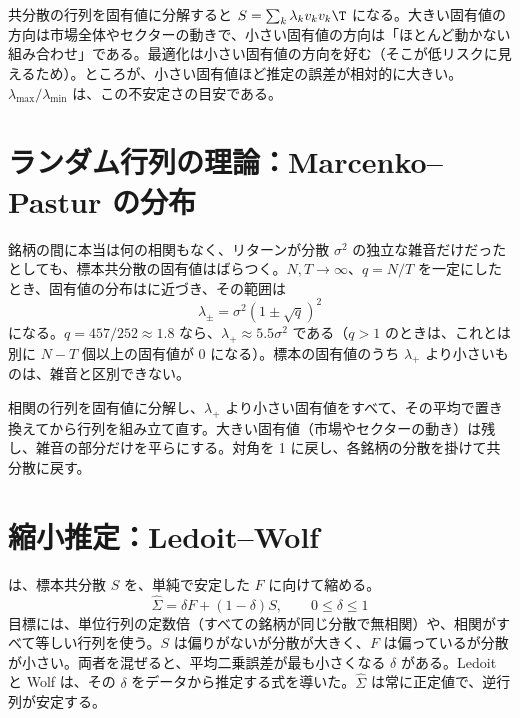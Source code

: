 共分散の行列を固有値に分解すると $S = \sum_k \lambda_k v_k v_k\T$ になる。大きい固有値の方向は市場全体やセクターの動きで、小さい固有値の方向は「ほとんど動かない組み合わせ」である。最適化は小さい固有値の方向を好む（そこが低リスクに見えるため）。ところが、小さい固有値ほど推定の誤差が相対的に大きい。 $\lambda_{\max}/\lambda_{\min}$ は、この不安定さの目安である。

\section{ランダム行列の理論：Marcenko--Pastur の分布}

銘柄の間に本当は何の相関もなく、リターンが分散 $\sigma^2$ の独立な雑音だけだったとしても、標本共分散の固有値はばらつく。$N,T\to\infty$、$q=N/T$ を一定にしたとき、固有値の分布はに近づき、その範囲は
\begin{equation}
\lambda_{\pm} = \sigma^2\left(1 \pm \sqrt{q}\right)^2
\end{equation}
になる。$q=457/252\approx1.8$ なら、$\lambda_+ \approx 5.5\sigma^2$ である（$q>1$ のときは、これとは別に $N-T$ 個以上の固有値が 0 になる）。標本の固有値のうち $\lambda_+$ より小さいものは、雑音と区別できない。

\begin{defbox}
相関の行列を固有値に分解し、$\lambda_+$ より小さい固有値をすべて、その平均で置き換えてから行列を組み立て直す。大きい固有値（市場やセクターの動き）は残し、雑音の部分だけを平らにする。対角を 1 に戻し、各銘柄の分散を掛けて共分散に戻す。
\end{defbox}

\section{縮小推定：Ledoit--Wolf}

は、標本共分散 $S$ を、単純で安定した $F$ に向けて縮める。
\begin{equation}
\hat\Sigma = \delta F + (1-\delta) S, \qquad 0\le\delta\le1
\end{equation}
目標には、単位行列の定数倍（すべての銘柄が同じ分散で無相関）や、相関がすべて等しい行列を使う。$S$ は偏りがないが分散が大きく、$F$ は偏っているが分散が小さい。両者を混ぜると、平均二乗誤差が最も小さくなる $\delta$ がある。Ledoit と Wolf は、その $\delta$ をデータから推定する式を導いた。$\hat\Sigma$ は常に正定値で、逆行列が安定する。

